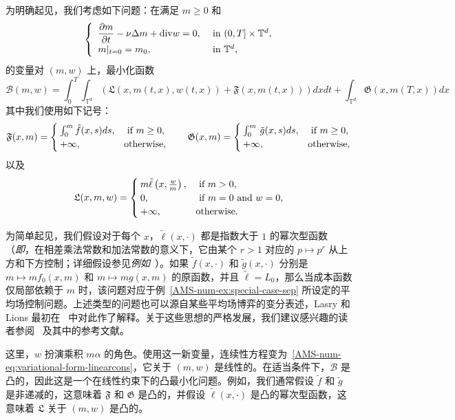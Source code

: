 \documentclass{amsproc}
\theoremstyle{definition}
\theoremstyle{remark}
\numberwithin{equation}{section}
\newcommand{\TT}{{\mathbb T}}
\newcommand{\cB}{{\mathcal B}}
\newcommand{\ctrl}{\alpha}
\newcommand{\diver}{\mathrm{div}}
\begin{document}
为明确起见，我们考虑如下问题：在满足 $m\ge 0$ 和
\begin{equation}
\label{AMS-num-eq:variational-form-linearcons}
\begin{cases}
	\displaystyle
	\,\, \frac{\partial m}{\partial t}  - \nu \Delta m + \diver w = 0, 
	&\hbox{ in } (0,T] \times \TT^d ,
	\\
	\,\, m|_{t=0} = m_0,  &\hbox{ in }  \TT^d ,
\end{cases}
\end{equation}
的变量对 $(m,w)$ 上，最小化函数
\begin{equation}
\label{AMS-num-eq:variational-primal-B}
	\cB(m,w) = \int_0^T \int_{\TT^d} \left(   \mathfrak{L}(x, m(t,x), w(t,x)) +   \mathfrak{F}(x, m(t,x)) \right) dx dt + \int_{\TT^d}   \mathfrak{G}(x, m(T,x)) dx
\end{equation}
其中我们使用如下记号：
$$
	  \mathfrak{F}(x,m) = 
	\begin{cases}
		\int_0^{m} \tilde f(x, s) ds, & \hbox{ if } m \ge 0,
		\\
		+\infty, 	& \hbox{otherwise,}
	\end{cases}
	\qquad
	  \mathfrak{G}(x,m) = 
	\begin{cases}
		\int_0^m \, \tilde g(x, s) ds, & \hbox{ if } m \ge 0,
		\\
		+\infty, 	& \hbox{otherwise,}
	\end{cases}
$$ 
以及
$$
	 \mathfrak{L}(x, m, w) = 
	\begin{cases}
		m \tilde \ell \left(x, \frac{w}{m}\right), & \hbox{ if } m > 0,
		\\
		0, 		& \hbox{ if } m = 0 \hbox{ and } w = 0,
		\\
		+\infty, 	& \hbox{otherwise}.
	\end{cases}
$$

为简单起见，我们假设对于每个 $x$，$\tilde \ell(x,\cdot)$ 都是指数大于 $1$ 的幂次型函数（\textit{即}，在相差乘法常数和加法常数的意义下，它由某个 $r>1$ 对应的 $p \mapsto p^{r}$ 从上方和下方控制；详细假设参见\textit{例如}~\cite{MR3358627}）。如果 $\tilde f(x, \cdot)$ 和 $\tilde g(x, \cdot)$ 分别是 $m \mapsto  m f_0(x, m)$ 和 $m \mapsto  m g(x, m)$ 的原函数，并且 $\tilde \ell  = L_0$，那么当成本函数仅局部依赖于 $m$ 时，该问题对应于例~\ref{AMS-num-ex:special-case-sep} 所设定的平均场控制问题。上述类型的问题也可以源自某些平均场博弈的变分表述，Lasry 和 Lions 最初在~\cite{MR2295621} 中对此作了解释。关于这些思想的严格发展，我们建议感兴趣的读者参阅~\cite{MR3399179,MR3358627,MR3498932} 及其中的参考文献。

这里，$w$ 扮演乘积 $m \ctrl$ 的角色。使用这一新变量，连续性方程变为~\eqref{AMS-num-eq:variational-form-linearcons}，它关于 $(m,w)$ 是线性的。在适当条件下，$\cB$ 是凸的，因此这是一个在线性约束下的凸最小化问题。例如，我们通常假设 $\tilde f$ 和 $\tilde g$ 是非递减的，这意味着 $\mathfrak{F}$ 和 $\mathfrak{G}$ 是凸的，并假设 $\tilde \ell(x,\cdot)$ 是凸的幂次型函数，这意味着 $\mathfrak{L}$ 关于 $(m,w)$ 是凸的。
 
\end{document}

